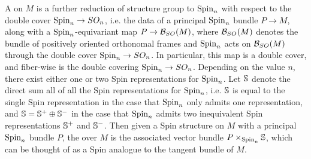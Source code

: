 A  on $M$ is a further reduction of structure group to
$\Spin_n$ with respect to the double cover $\Spin_n \to SO_n$, i.e. the data of
a principal $\Spin_n$ bundle $P \to M$, along with a $\Spin_n$-equivariant map
$P \to \B_{SO}(M)$, where $\B_{SO}(M)$ denotes the bundle of positively oriented
orthonomal frames
and $\Spin_n$ acts on $\B_{SO}(M)$ through the double cover $\Spin_n \to SO_n$. In
particular, this map is a double cover, and fiber-wise is the double covering
$\Spin_n \to SO_n$.
Depending on the value $n$, there exist either one or two Spin representations
for $\Spin_n$. Let $\S$ denote the direct sum all of all the Spin representations
for $\Spin_n$, i.e. $\S$ is equal to the single Spin representation in the
case that $\Spin_n$ only admits one representation, and $\S = \S^+ \oplus \S^-$
in the case that $\Spin_n$ admits two inequivalent Spin representations $\S^+$
and $\S^-$. Then given a Spin structure on $M$ with a principal $\Spin_n$ bundle
$P$, the  over $M$ is the associated vector bundle
$P \times_{\Spin_n} \S$, which can be thought of as a Spin analogue to
the tangent bundle of $M$.
%
